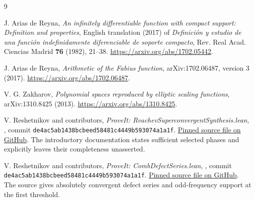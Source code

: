 \documentclass[11pt,a4paper]{article}
\numberwithin{equation}{section}
\theoremstyle{plain}
\theoremstyle{definition}
\theoremstyle{remark}
\begin{document}
\begin{thebibliography}{9}
\raggedright
{}
J. Arias de Reyna,
\emph{An infinitely differentiable function with compact support:
Definition and properties}, English translation (2017) of
\emph{Definici\'on y estudio de una funci\'on indefinidamente diferenciable
de soporte compacto}, Rev. Real Acad. Ciencias Madrid \textbf{76}
(1982), 21--38.
\url{https://arxiv.org/abs/1702.05442}.

J. Arias de Reyna,
\emph{Arithmetic of the Fabius function}, arXiv:1702.06487, version 3
(2017).
\url{https://arxiv.org/abs/1702.06487}.

V. G. Zakharov,
\emph{Polynomial spaces reproduced by elliptic scaling functions},
arXiv:1310.8425 (2013).
\url{https://arxiv.org/abs/1310.8425}.

V. Reshetnikov and contributors,
\emph{ProveIt: RvachevSuperconvergentSynthesis.lean},
,
commit \texttt{de4ac5ab1438bcbeed58481c4449b593074a1a1f}.
\href{https://github.com/VladimirReshetnikov/ProveIt/blob/de4ac5ab1438bcbeed58481c4449b593074a1a1f/Analysis/FabiusFunction/Lean/FabiusFunction/RvachevSuperconvergentSynthesis.lean}{Pinned source file on GitHub}.
The introductory documentation states sufficient selected phases and
explicitly leaves their completeness unasserted.

V. Reshetnikov and contributors,
\emph{ProveIt: CombDefectSeries.lean},
,
commit \texttt{de4ac5ab1438bcbeed58481c4449b593074a1a1f}.
\href{https://github.com/VladimirReshetnikov/ProveIt/blob/de4ac5ab1438bcbeed58481c4449b593074a1a1f/Analysis/FabiusFunction/Lean/FabiusFunction/CombDefectSeries.lean}{Pinned source file on GitHub}.
The source gives absolutely convergent defect series and odd-frequency
support at the first threshold.
\end{thebibliography}
\end{document}
